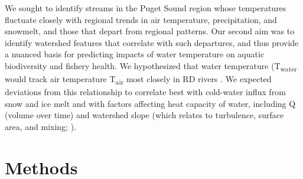 \documentclass[notitlepage]{article}
\begin{document}

We sought to identify streams in the Puget Sound region whose temperatures fluctuate closely with regional trends in air temperature, precipitation, and snowmelt, and those that depart from regional patterns. Our second aim was to identify watershed features that correlate with such departures, and thus provide a nuanced basis for predicting impacts of water temperature on aquatic biodiversity and fishery health. We hypothesized that water temperature (T\textsubscript{water} would track air temperature T\textsubscript{air} most closely in RD rivers \citep{ward1985thermal,garner2014river}. We expected deviations from this relationship to correlate best with cold-water influx from snow and ice melt \citep{lisi2015watershed} and with factors affecting heat capacity of water, including Q (volume over time) and watershed slope (which relates to turbulence, surface area, and mixing; \citealt{van2013global}).


\section*{Methods}



\end{document}
